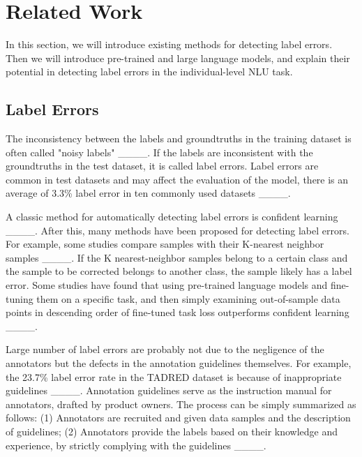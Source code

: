 \section{Related Work}
In this section, we will introduce existing methods for detecting label errors. Then we will introduce pre-trained and large language models, and explain their potential in detecting label errors in the individual-level NLU task.

\subsection{Label Errors}
The inconsistency between the labels and groundtruths in the training dataset is often called "noisy labels" ____. If the labels are inconsistent with the groundtruths in the test dataset, it is called label errors. Label errors are common in test datasets and may affect the evaluation of the model, there is an average of 3.3\% label error in ten commonly used datasets ____. 

A classic method for automatically detecting label errors is confident learning ____. After this, many methods have been proposed for detecting label errors. For example, some studies compare samples with their K-nearest neighbor samples ____. If the K nearest-neighbor samples belong to a certain class and the sample to be corrected belongs to another class, the sample likely has a label error. Some studies have found that using pre-trained language models and fine-tuning them on a specific task, and then simply examining out-of-sample data points in descending order of fine-tuned task loss outperforms confident learning ____.

Large number of label errors are probably not due to the negligence of the annotators but the defects in the annotation guidelines themselves. For example, the 23.7\% label error rate in the TADRED dataset is because of inappropriate guidelines ____. Annotation guidelines serve as the instruction manual for annotators, drafted by product owners. The process can be simply summarized as follows: (1) Annotators are recruited and given data samples and the description of guidelines; (2) Annotators provide the labels based on their knowledge and experience, by strictly complying with the guidelines ____.

